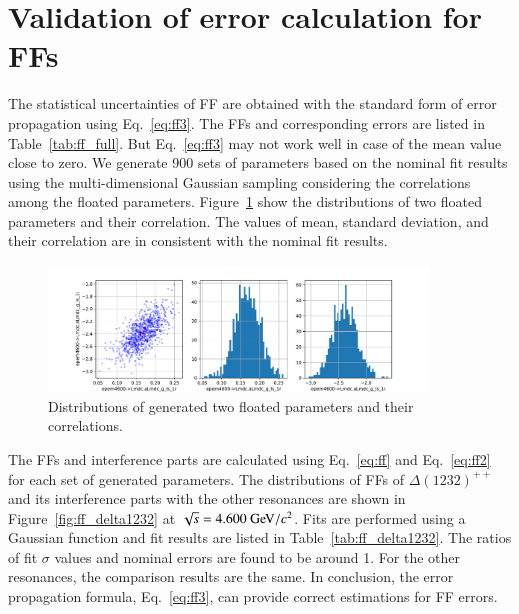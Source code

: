 \clearpage
\section{Validation of error calculation for FFs}
\label{app:ff_error}

The statistical uncertainties of FF are obtained with the standard form of error propagation using Eq.~\ref{eq:ff3}. The FFs and corresponding errors are listed in Table~\ref{tab:ff_full}. But Eq.~\ref{eq:ff3} may not work well in case of the mean value close to zero. We generate 900 sets of parameters based on the nominal fit results using the multi-dimensional Gaussian sampling considering the correlations among the floated parameters. Figure~\ref{fig:gen_params} show the distributions of two floated parameters and their correlation. The values of mean, standard deviation, and their correlation are in consistent with the nominal fit results.

\begin{figure}[h]\centering
    \includegraphics[width=0.90\textwidth]{figure/app_ff/sample.pdf}
    \caption{Distributions of generated two floated parameters and their correlations.}
\label{fig:gen_params} 
\end{figure}

The FFs and interference parts are calculated using Eq.~\ref{eq:ff} and Eq.~\ref{eq:ff2} for each set of generated parameters. The distributions of FFs of $\Delta(1232)^{++}$ and its interference parts with the other resonances are shown in Figure~\ref{fig:ff_delta1232} at $\sqrt{s} = 4.600\gev/c^2$. Fits are performed using a Gaussian function and fit results are listed in Table~\ref{tab:ff_delta1232}. The ratios of fit $\sigma$ values and nominal errors are found to be around 1. For the other resonances, the comparison results are the same. In conclusion, the error propagation formula, Eq.~\ref{eq:ff3}, can provide correct estimations for FF errors. 

